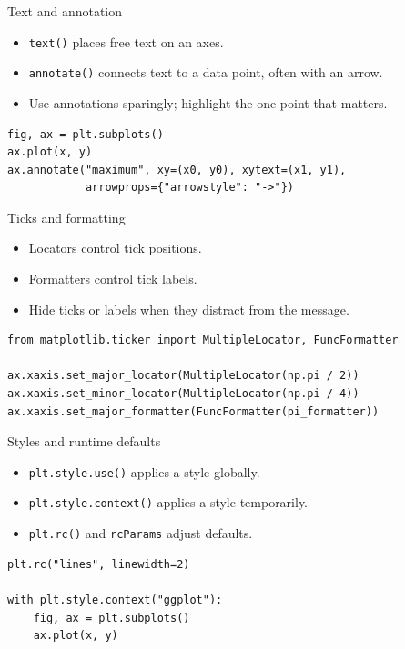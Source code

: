 \documentclass[aspectratio=43,11pt]{beamer}
\begin{document}
\begin{frame}[fragile]{Text and annotation}
\begin{itemize}
  \item \texttt{text()} places free text on an axes.
  \item \texttt{annotate()} connects text to a data point, often with an arrow.
  \item Use annotations sparingly; highlight the one point that matters.
\end{itemize}

\begin{lstlisting}
fig, ax = plt.subplots()
ax.plot(x, y)
ax.annotate("maximum", xy=(x0, y0), xytext=(x1, y1),
            arrowprops={"arrowstyle": "->"})
\end{lstlisting}
\end{frame}

\begin{frame}[fragile]{Ticks and formatting}
\begin{itemize}
  \item Locators control tick positions.
  \item Formatters control tick labels.
  \item Hide ticks or labels when they distract from the message.
\end{itemize}

\begin{lstlisting}
from matplotlib.ticker import MultipleLocator, FuncFormatter

ax.xaxis.set_major_locator(MultipleLocator(np.pi / 2))
ax.xaxis.set_minor_locator(MultipleLocator(np.pi / 4))
ax.xaxis.set_major_formatter(FuncFormatter(pi_formatter))
\end{lstlisting}
\end{frame}

\begin{frame}[fragile]{Styles and runtime defaults}
\begin{itemize}
  \item \texttt{plt.style.use()} applies a style globally.
  \item \texttt{plt.style.context()} applies a style temporarily.
  \item \texttt{plt.rc()} and \texttt{rcParams} adjust defaults.
\end{itemize}

\begin{lstlisting}
plt.rc("lines", linewidth=2)

with plt.style.context("ggplot"):
    fig, ax = plt.subplots()
    ax.plot(x, y)
\end{lstlisting}
\end{frame}
\end{document}
